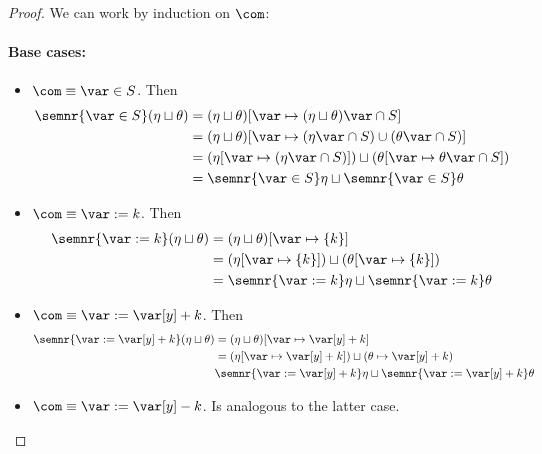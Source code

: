 \begin{proof}
  We can work by induction on \(\com\):
  \paragraph*{Base cases: \\}
  \noindent
  \begin{itemize}
  \item \(\com \equiv \var \in S\). Then
    \begin{align*}
      \semnr{\var \in S}(\eta \sqcup \theta) & = (\eta \sqcup \theta)[\var \mapsto (\eta \sqcup \theta)\var \cap S] \\
                                             & = (\eta \sqcup \theta)[\var \mapsto (\eta\var \cap S) \cup (\theta\var \cap S)] \\
                                             & = (\eta[\var \mapsto (\eta\var \cap S)]) \sqcup (\theta[\var \mapsto \theta\var \cap S]) \\
                                             & = \semnr{\var \in S}\eta \sqcup \semnr{\var \in S}\theta
    \end{align*}
    
  \item \(\com \equiv \var := k\). Then
    \begin{align*}
      \semnr{\var := k}(\eta \sqcup \theta) & = (\eta \sqcup \theta)[\var \mapsto \{k\}] \\
                                            & = (\eta[\var \mapsto \{k\}]) \sqcup (\theta[\var \mapsto \{k\}]) \\
                                            & = \semnr{\var := k}\eta \sqcup \semnr{\var := k}\theta
    \end{align*}
  \item \(\com \equiv \var := \var[y] + k\). Then
    \begin{align*}
      \semnr{\var := \var[y] + k}(\eta \sqcup \theta) & = (\eta \sqcup \theta)[\var \mapsto \var[y] + k] \\
                                                      & = (\eta[\var \mapsto \var[y] + k]) \sqcup (\theta \mapsto \var[y] + k) \\
                                                      & \semnr{\var := \var[y] + k}\eta \sqcup \semnr{\var := \var[y] + k}\theta
    \end{align*}
  \item \(\com \equiv \var := \var[y] - k\). Is analogous to the
    latter case.
  \end{itemize}


\end{proof}
